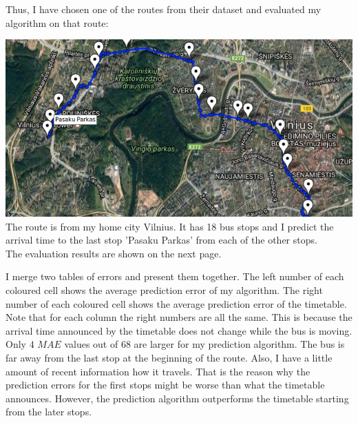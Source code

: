 \documentclass[12pt,a4paper,oneside,openright]{report}
\begin{document}
Thus, I have chosen one of the routes from their dataset and evaluated my algorithm
on that route:
\:

\includegraphics[width=\textwidth]{figs/vilnius_route.png} \\

The route is from my home city Vilnius. It has 18 bus stops and
I predict the arrival time to the last stop 'Pasaku Parkas' from each
of the other stops. \\

The evaluation results are shown on the next page.

\newpage
I merge two tables of errors and present them together. The left number of each coloured cell shows the
average prediction error of my algorithm. The right number of each coloured cell
shows the average prediction error of the timetable. \\


Note that for each column the right numbers are all the same. This is because the
arrival time announced by the timetable does not change while the bus is moving. \\

Only $4$ $MAE$ values out of $68$ are larger for my prediction algorithm. The bus is far
away from the last stop at the beginning of the route. Also, I have a little amount
of recent information how it travels. That is the reason why the prediction errors
for the first stops might be worse than what the timetable announces. However, the prediction
algorithm outperforms the timetable starting from the later stops. \\
\end{document}
